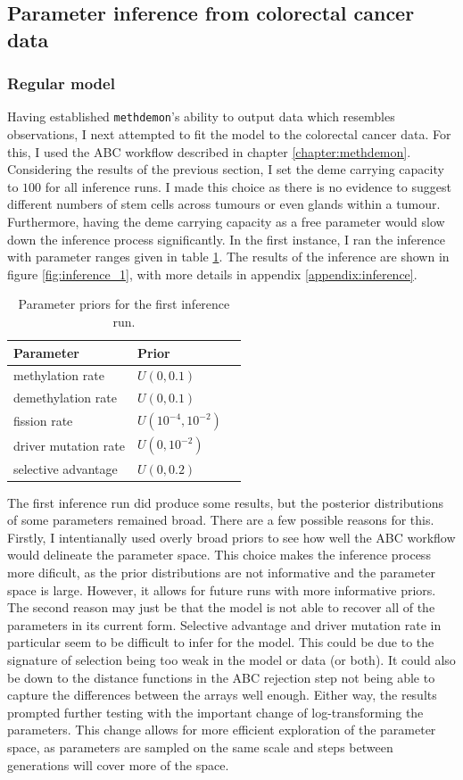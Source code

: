 \subsection{Parameter inference from colorectal cancer data}
\subsubsection{Regular model}
Having established \texttt{methdemon}'s ability to output data which resembles
observations, I next attempted to fit the model to the colorectal cancer data.
For this, I used the ABC workflow described in chapter \ref{chapter:methdemon}.
Considering the results of the previous section, I set the deme carrying
capacity to $100$ for all inference runs. I made this choice as there is no
evidence to suggest different numbers of stem cells across tumours or even
glands within a tumour. Furthermore, having the deme carrying capacity as a free
parameter would slow down the inference process significantly.
In the first instance, I ran the inference with parameter ranges given in table
\ref{tab:inf_ranges}. The results of the inference are shown in figure
\ref{fig:inference_1}, with more details in appendix \ref{appendix:inference}.

\begin{table}[ht]
\centering
\begin{tabular}{|l|l|l|}
\hline
Parameter & Prior \\
\hline
methylation rate & $U(0, 0.1)$ \\
demethylation rate & $U(0, 0.1)$ \\
fission rate & $U(10^{-4}, 10^{-2})$ \\
driver mutation rate & $U(0, 10^{-2})$ \\
selective advantage & $U(0, 0.2)$ \\
\hline
\end{tabular}
\caption{Parameter priors for the first inference run.}
\label{tab:inf_ranges}
\end{table}

The first inference run did produce some results, but the posterior
distributions of some parameters remained broad. There are a few possible
reasons for this. Firstly, I intentianally used overly broad priors to see how
well the ABC workflow would delineate the parameter space. This choice makes the
inference process more dificult, as the prior distributions are not informative
and the parameter space is large. However, it allows for future runs with more
informative priors. The second reason may just be that the model is not able to
recover all of the parameters in its current form. Selective advantage and
driver mutation rate in particular seem to be difficult to infer for the model.
This could be due to the signature of selection being too weak in the model or
data (or both). It could also be down to the distance functions in the ABC
rejection step not being able to capture the differences between the arrays
well enough. Either way, the results prompted further testing with the important
change of log-transforming the parameters. This change allows for more efficient
exploration of the parameter space, as parameters are sampled on the same scale
and steps between generations will cover more of the space.

